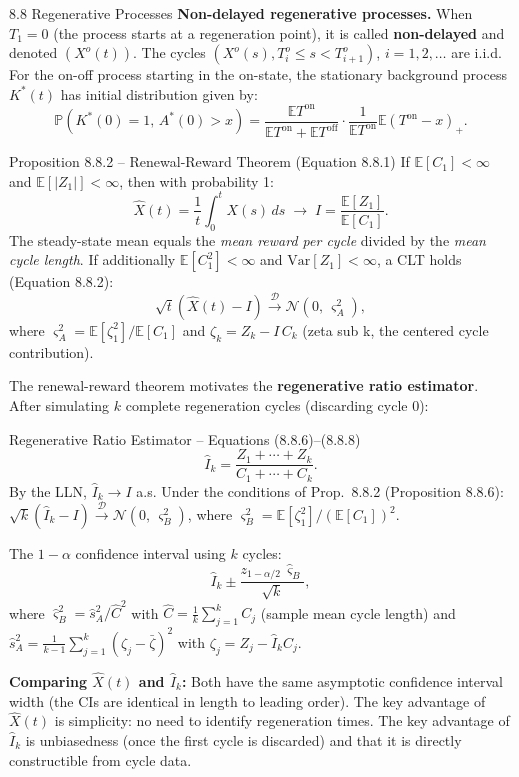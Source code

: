 \documentclass[aspectratio=169,10pt]{beamer}
\newcommand{\E}{\mathbb{E}}
\newcommand{\Prob}{\mathbb{P}}
\begin{document}
\begin{frame}[allowframebreaks]{8.8 Regenerative Processes}
\textbf{Non-delayed regenerative processes.}  When $T_1 = 0$ (the process starts
at a regeneration point), it is called \textbf{non-delayed} and denoted
$(X^o(t))$.  The cycles $(X^o(s), T^o_i \le s < T^o_{i+1})$, $i=1,2,\ldots$
are i.i.d.  For the on-off process starting in the on-state, the stationary
background process $K^*(t)$ has initial distribution given by:
\[
  \Prob(K^*(0)=1,\, A^*(0)>x) = \frac{\E T^{\mathrm{on}}}{\E T^{\mathrm{on}}+\E T^{\mathrm{off}}}
  \cdot \frac{1}{\E T^{\mathrm{on}}}\E(T^{\mathrm{on}}-x)_+.
\]

\framebreak

\begin{block}{Proposition 8.8.2 -- Renewal-Reward Theorem (Equation 8.8.1)}
If $\E[C_1] < \infty$ and $\E[|Z_1|] < \infty$, then with probability 1:
\[
  \hat{X}(t) = \frac{1}{t}\int_0^t X(s)\,ds \;\to\;
  I = \frac{\E[Z_1]}{\E[C_1]}.
\]
The steady-state mean equals the \emph{mean reward per cycle} divided by the
\emph{mean cycle length}.  If additionally $\E[C_1^2] < \infty$ and
$\mathrm{Var}[Z_1] < \infty$, a CLT holds (Equation 8.8.2):
\[
  \sqrt{t}(\hat{X}(t) - I) \xrightarrow{\mathcal{D}} \mathcal{N}(0,\,\varsigma_A^2),
\]
where $\varsigma_A^2 = \E[\zeta_1^2]/\E[C_1]$ and $\zeta_k = Z_k - I\,C_k$
(zeta sub k, the centered cycle contribution).
\end{block}

The renewal-reward theorem motivates the \textbf{regenerative ratio estimator}.
After simulating $k$ complete regeneration cycles (discarding cycle 0):

\begin{block}{Regenerative Ratio Estimator -- Equations (8.8.6)--(8.8.8)}
\[
  \hat{I}_k = \frac{Z_1 + \cdots + Z_k}{C_1 + \cdots + C_k}.
\]
By the LLN, $\hat{I}_k \to I$ a.s.  Under the conditions of Prop.\ 8.8.2
(Proposition 8.8.6): $\sqrt{k}(\hat{I}_k - I) \xrightarrow{\mathcal{D}}
\mathcal{N}(0,\,\varsigma_B^2)$, where
$\varsigma_B^2 = \E[\zeta_1^2]/(\E[C_1])^2$.

The $1-\alpha$ confidence interval using $k$ cycles:
\[
  \hat{I}_k \pm \frac{z_{1-\alpha/2}\,\hat{\varsigma}_B}{\sqrt{k}},
\]
where $\hat{\varsigma}_B^2 = \hat{s}_A^2 / \hat{C}^2$ with
$\hat{C} = \frac{1}{k}\sum_{j=1}^k C_j$ (sample mean cycle length) and
$\hat{s}_A^2 = \frac{1}{k-1}\sum_{j=1}^k (\zeta_j - \bar{\zeta})^2$ with
$\zeta_j = Z_j - \hat{I}_k C_j$.
\end{block}

\framebreak

\textbf{Comparing $\hat{X}(t)$ and $\hat{I}_k$:}  Both have the same asymptotic
confidence interval width (the CIs are identical in length to leading order).
The key advantage of $\hat{X}(t)$ is simplicity: no need to identify regeneration
times.  The key advantage of $\hat{I}_k$ is unbiasedness (once the first cycle
is discarded) and that it is directly constructible from cycle data.

\end{frame}
\end{document}

